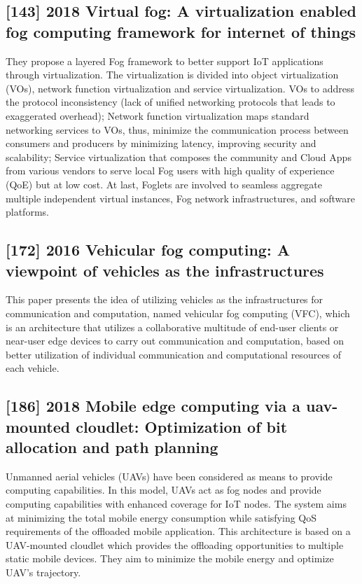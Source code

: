 \subsection{[143] 2018 Virtual fog: A virtualization enabled fog computing framework for internet of things}
\label{subsec:paper04} \cite{li2018virtual}
They propose a layered Fog framework to better support IoT applications through virtualization. The virtualization is divided into object virtualization 
(VOs), network function virtualization and service virtualization. VOs to address the protocol inconsistency (lack of unified networking protocols that leads to exaggerated overhead); Network function virtualization maps standard networking services to VOs, thus, minimize the communication process between consumers and producers by minimizing latency, improving security and scalability; Service virtualization that composes the community and Cloud Apps from various vendors to serve local Fog users with high quality of experience (QoE) but at low cost. At last, Foglets are involved to seamless aggregate multiple independent virtual instances, Fog network infrastructures, and software platforms.

\subsection{[172] 2016 Vehicular fog computing: A viewpoint of vehicles as the infrastructures}
\label{subsec:paper05} \cite{hou2016vehicular}
This paper presents the idea of utilizing vehicles as the infrastructures for communication and computation, named vehicular fog computing (VFC), which is an architecture that utilizes a collaborative multitude of end-user clients or near-user edge devices to carry out communication and computation, based on better utilization of individual communication and computational resources of each vehicle.

\subsection{[186] 2018 Mobile edge computing via a uav-mounted cloudlet: Optimization of bit allocation and path planning}
\label{subsec:paper06} \cite{jeong2018mobile}
Unmanned aerial vehicles (UAVs) have been considered as means to provide computing capabilities. In this model, UAVs act as fog nodes and provide computing capabilities with enhanced coverage for IoT nodes. The system aims at minimizing the total mobile energy consumption while satisfying QoS requirements of the offloaded mobile application. This architecture is based on a UAV-mounted cloudlet which provides the offloading opportunities to multiple static mobile devices. They aim to minimize the mobile energy and optimize UAV’s trajectory.

